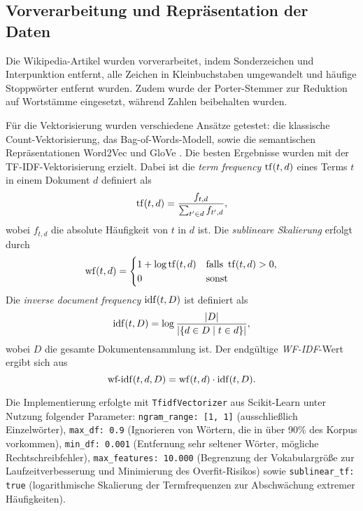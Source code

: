 \subsection{Vorverarbeitung und Repräsentation der Daten}
\label{sec:vorverarbeitung}

Die Wikipedia-Artikel wurden vorverarbeitet, indem Sonderzeichen und Interpunktion entfernt, alle Zeichen in Kleinbuchstaben umgewandelt und häufige Stoppwörter entfernt wurden. Zudem wurde der Porter-Stemmer \cite{Porter2006} zur Reduktion auf Wortstämme eingesetzt, während Zahlen beibehalten wurden.

Für die Vektorisierung wurden verschiedene Ansätze getestet: die klassische Count-Vektorisierung, das Bag-of-Words-Modell, sowie die semantischen Repräsentationen Word2Vec \cite{Mikolov2013} und GloVe \cite{Pennington2014}. Die besten Ergebnisse wurden mit der TF-IDF-Vektorisierung erzielt. Dabei ist die \textit{term frequency} $\operatorname{tf}(t, d)$ eines Terms $t$ in einem Dokument $d$ definiert als
\begin{equation*}
    \operatorname{tf}(t, d) = \frac{f_{t, d}}{\sum_{t'\in d}f_{t', d}},
\end{equation*}
wobei $f_{t, d}$ die absolute Häufigkeit von $t$ in $d$ ist. Die \textit{sublineare Skalierung} erfolgt durch
\begin{equation*}
    \operatorname{wf}(t, d) = \begin{cases}
        1 + \log \operatorname{tf}(t, d) &\text{falls } \operatorname{tf}(t, d) > 0,\\
        0 &\text{sonst}
    \end{cases}
\end{equation*}
Die \textit{inverse document frequency} $\operatorname{idf}(t, D)$ ist definiert als
\begin{equation*}
    \operatorname{idf}(t, D) = \log\frac{\vert D\vert}{\vert\{d\in D \mid t\in d\}\vert},
\end{equation*}
wobei $D$ die gesamte Dokumentensammlung ist. Der endgültige \textit{WF-IDF}-Wert ergibt sich aus
\begin{equation*}
    \operatorname{wf-idf}(t, d, D) = \operatorname{wf}(t, d)\cdot \operatorname{idf}(t, D).
\end{equation*}

Die Implementierung erfolgte mit \texttt{TfidfVectorizer} aus Scikit-Learn \cite{Pedregosa2011} unter Nutzung folgender Parameter: \texttt{ngram\_range: [1, 1]} (ausschließlich Einzelwörter), \texttt{max\_df: 0.9} (Ignorieren von Wörtern, die in über 90\% des Korpus vorkommen), \texttt{min\_df: 0.001} (Entfernung sehr seltener Wörter, mögliche Rechtschreibfehler), \texttt{max\_features: 10.000} (Begrenzung der Vokabulargröße zur Laufzeitverbesserung und Minimierung des Overfit-Risikos) sowie \texttt{sublinear\_tf: true} (logarithmische Skalierung der Termfrequenzen zur Abschwächung extremer Häufigkeiten).